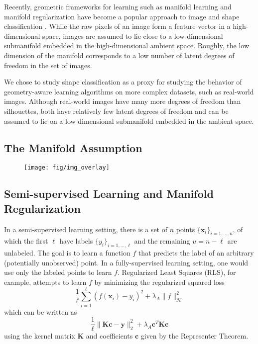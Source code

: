 \documentclass[anon,11pt]{9520} %
\newcommand{\mb}{\mathbf}
\begin{document}
Recently, geometric frameworks for learning such as manifold learning and manifold regularization \cite{people} have become a popular approach to image and shape classification \cite{people}. While the raw pixels of an image form a feature vector in a high-dimensional space, images are assumed to lie close to a low-dimensional submanifold embedded in the high-dimensional ambient space. Roughly, the low dimension of the manifold corresponds to a low number of latent degrees of freedom in the set of images.  

We chose to study shape classification as a proxy for studying the behavior of geometry-aware learning algorithms on more complex datasets, such as real-world images. Although real-world images have many more degrees of freedom than silhouettes, both have relatively few latent degrees of freedom and can be assumed to lie on a low dimensional submanifold embedded in the ambient space.

\subsection{The Manifold Assumption}



\begin{figure}
\begin{center}
\texttt{[image: fig/img\_overlay]}
\end{center}
\end{figure}

\subsection{Semi-supervised Learning and Manifold Regularization}
In a semi-supervised learning setting, there is a set of $n$ points $\{\mb x_i\}_{i=1,\dots,n}$, of which the first $\ell$ have labels $\{y_i\}_{i=1,\dots,\ell}$ and the remaining $u=n-\ell$ are unlabeled. The goal is to learn a function $f$ that predicts the label of an arbitrary (potentially unobserved) point. In a fully-supervised learning setting, one would use only the labeled points to learn $f$. Regularized Least Squares (RLS), for example, attempts to learn $f$ by minimizing the regularized squared loss \[\frac{1}{\ell}\sum_{i=1}^{\ell} (f(\mb{x}_i)-y_i)^2 + \lambda_A \|f\|_{\mathcal{H}}^2\] which can be written as \[ \frac{1}{\ell}\|\mb{K}\mb{c} - \mb{y}\|_2^2  + \lambda_A \mb{c}^T \mb{K} \mb{c} \] using the kernel matrix $\mb{K}$ and coefficients $\mb{c}$ given by the Representer Theorem.
\end{document}
